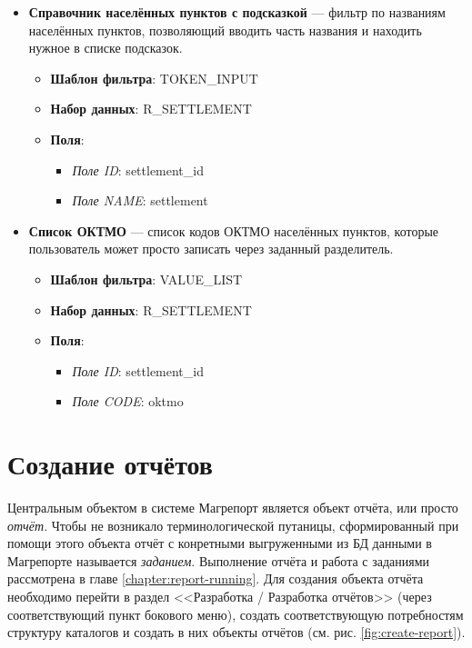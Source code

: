 \documentclass[../user-manual.tex]{subfiles}
\begin{document}
\begin{modelExample}
\begin{itemize}
\begin{itemize}
				\end{itemize}
			
			\item \textbf{Справочник населённых пунктов с подсказкой} --- фильтр по названиям населённых пунктов, позволяющий вводить часть названия и находить нужное в списке подсказок.

				\begin{itemize}
					\item \textbf{Шаблон фильтра}: TOKEN\_INPUT
					\item \textbf{Набор данных}: R\_SETTLEMENT
					\item \textbf{Поля}:
					\begin{itemize}
						\item \textit{Поле ID}: settlement\_id
						\item \textit{Поле NAME}: settlement
					\end{itemize}
					
				\end{itemize}
			
			\item \textbf{Список ОКТМО} --- список кодов ОКТМО населённых пунктов, которые пользователь может просто записать через заданный разделитель.
			
				\begin{itemize}
					\item \textbf{Шаблон фильтра}: VALUE\_LIST
					\item \textbf{Набор данных}: R\_SETTLEMENT
					\item \textbf{Поля}:
					\begin{itemize}
						\item \textit{Поле ID}: settlement\_id
						\item \textit{Поле CODE}: oktmo
					\end{itemize}
					
				\end{itemize}			
			
		\end{itemize}
	\end{modelExample}

	\section{Создание отчётов}\label{report-developing}
	
	Центральным объектом в системе Магрепорт является объект отчёта, или просто \textit{отчёт}. Чтобы не возникало терминологической путаницы, сформированный при помощи этого объекта отчёт с конретными выгруженными из БД данными в Магрепорте называется \textit{заданием}. Выполнение отчёта и работа с заданиями рассмотрена в главе \ref{chapter:report-running}. Для создания объекта отчёта необходимо перейти в раздел <<Разработка / Разработка отчётов>> (через соответствующий пункт бокового меню), создать соответствующую потребностям структуру каталогов и создать в них объекты отчётов (см. рис. \ref{fig:create-report}).
	
\end{document}
